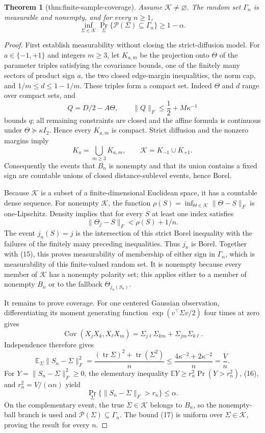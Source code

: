 \documentclass{article}
\newtheorem{theorem}{Theorem}
\begin{document}
\begin{theorem}[thm:finite-sample-coverage]\label{thm:finite-sample-coverage}
Assume \(\mathcal K\ne\varnothing\). The random set \(\Gamma_n\) is measurable and nonempty, and for every \(n\ge1\), \[\inf_{\Sigma\in\mathcal K}\Pr_{\Sigma}\{\mathcal P(\Sigma)\subseteq\Gamma_n\}\ge1-\alpha.\]
\end{theorem}
\begin{proof}
First establish measurability without closing the strict-diffusion model.  For \(a\in\{-1,+1\}\) and integers \(m\ge3\), let \(K_{a,m}\) be the projection onto \(\Theta\) of the parameter triples satisfying the covariance bounds, one of the finitely many sectors of product sign \(a\), the two closed edge-margin inequalities, the norm cap, and \(1/m\le d\le1-1/m\).  These triples form a compact set.  Indeed \(\Theta\) and \(d\) range over compact sets, and
\[
 Q=D/2-A\Theta,\qquad
 \lVert Q\rVert_F\le\frac12+M\kappa^{-1}
\]
bounds \(q\); all remaining constraints are closed and the affine formula is continuous under \(\Theta\succeq\kappa I_2\).  Hence every \(K_{a,m}\) is compact.  Strict diffusion and the nonzero margins imply
\[
 K_a=\bigcup_{m\ge3}K_{a,m},\qquad
 \mathcal K=K_{-1}\cup K_{+1}. \tag{15}
\]
Consequently the events that \(B_n\) is nonempty and that its union contains a fixed sign are countable unions of closed distance-sublevel events, hence Borel.

Because \(\mathcal K\) is a subset of a finite-dimensional Euclidean space, it has a countable dense sequence.  For nonempty \(\mathcal K\), the function \(\rho(S)=\inf_{\Theta\in\mathcal K}\lVert\Theta-S\rVert_F\) is one-Lipschitz.  Density implies that for every \(S\) at least one index satisfies
\[
 \lVert\Theta_j-S\rVert_F<\rho(S)+1/n.
\]
The event \(j_n(S)=j\) is the intersection of this strict Borel inequality with the failures of the finitely many preceding inequalities.  Thus \(j_n\) is Borel.  Together with (15), this proves measurability of membership of either sign in \(\Gamma_n\), which is measurability of this finite-valued random set.  It is nonempty because every member of \(\mathcal K\) has a nonempty polarity set; this applies either to a member of nonempty \(B_n\) or to the fallback \(\Theta_{j_n(S_n)}\).

It remains to prove coverage.  For one centered Gaussian observation, differentiating its moment generating function \(\exp(v^{\top}\Sigma v/2)\) four times at zero gives
\[
 \operatorname{Cov}(X_jX_k,X_\ell X_m)
 =\Sigma_{j\ell}\Sigma_{km}+\Sigma_{jm}\Sigma_{k\ell}.
\]
Independence therefore gives
\[
 \mathbb E_{\Sigma}\lVert S_n-\Sigma\rVert_F^2
 =\frac{(\operatorname{tr}\Sigma)^2+\operatorname{tr}(\Sigma^2)}{n}
 \le\frac{4\kappa^{-2}+2\kappa^{-2}}n=\frac Vn. \tag{16}
\]
For \(Y=\lVert S_n-\Sigma\rVert_F^2\ge0\), the elementary inequality \(\mathbb E Y\ge r_n^2\Pr(Y>r_n^2)\), (16), and \(r_n^2=V/(\alpha n)\) yield
\[
 \Pr_{\Sigma}\{\lVert S_n-\Sigma\rVert_F>r_n\}\le\alpha. \tag{17}
\]
On the complementary event, the true \(\Sigma\in\mathcal K\) belongs to \(B_n\), so the nonempty-ball branch is used and \(\mathcal P(\Sigma)\subseteq\Gamma_n\).  The bound (17) is uniform over \(\Sigma\in\mathcal K\), proving the result for every \(n\).
\end{proof}
\end{document}
